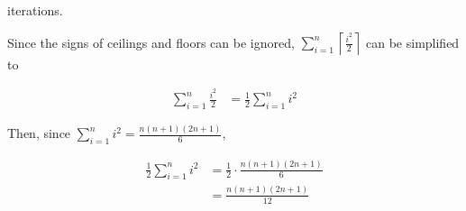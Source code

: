 \documentclass[12pt]{article}
\begin{document}
\begin{enumerate}[a.]
    iterations.

    \bigskip

    Since the signs of ceilings and floors can be ignored, $\sum\limits_{i=1}^{n} \left\lceil \frac{i^2}{2} \right\rceil$
    can be simplified to

    \begin{align}
        \sum\limits_{i=1}^{n} \frac{i^2}{2} &= \frac{1}{2} \sum\limits_{i=1}^{n} i^2
    \end{align}

    \bigskip

    Then, since $\sum\limits_{i=1}^{n} i^2 = \frac{n(n+1)(2n+1)}{6}$,

    \begin{align}
        \frac{1}{2} \sum\limits_{i=1}^{n} i^2 &= \frac{1}{2} \cdot \frac{n(n+1)(2n+1)}{6}\\
        &= \frac{n(n+1)(2n+1)}{12}
    \end{align}

\end{enumerate}
\end{document}
